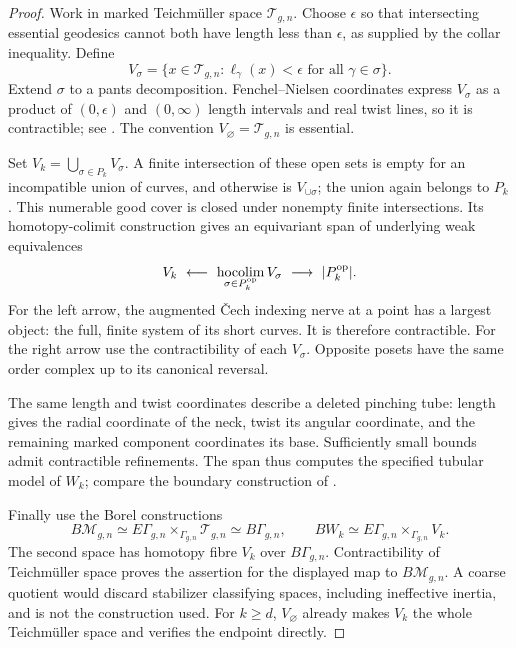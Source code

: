 \begin{proof}
Work in marked Teichm\"uller space \(\mathcal T_{g,n}\).
Choose \(\epsilon\) so that intersecting essential geodesics cannot
both have length less than \(\epsilon\), as supplied by the collar
inequality. Define
\[
 V_\sigma=\{x\in\mathcal T_{g,n}:
               \ell_\gamma(x)<\epsilon\text{ for all }\gamma\in\sigma\}.
\]
Extend \(\sigma\) to a pants decomposition. Fenchel--Nielsen
coordinates express \(V_\sigma\) as a product of \((0,\epsilon)\)
and \((0,\infty)\) length intervals and real twist lines, so it is
contractible; see \citet[Chapter 1, Theorem 1.1]{Harer1988}.
The convention \(V_\varnothing=\mathcal T_{g,n}\) is essential.

Set \(V_k=\bigcup_{\sigma\in P_k}V_\sigma\). A finite intersection
of these open sets is empty for an incompatible union of curves,
and otherwise is \(V_{\cup\sigma}\); the union again belongs to
\(P_k\). This numerable good cover is closed under nonempty finite
intersections. Its homotopy-colimit construction gives an
equivariant span of underlying weak equivalences
\[
 V_k\ \longleftarrow\
 \hocolim_{\sigma\in P_k^{\mathrm{op}}}V_\sigma
 \ \longrightarrow\ |P_k^{\mathrm{op}}|.
\]
For the left arrow, the augmented \v{C}ech indexing nerve at a
point has a largest object: the full, finite system of its short
curves. It is therefore contractible. For the right arrow use the
contractibility of each \(V_\sigma\). Opposite posets have the same
order complex up to its canonical reversal.

The same length and twist coordinates describe a deleted pinching
tube: length gives the radial coordinate of the neck, twist its
angular coordinate, and the remaining marked component coordinates
its base. Sufficiently small bounds admit contractible refinements.
The span thus computes the specified tubular model of \(W_k\);
compare the boundary construction of
\citet[Chapter 3, Lemma 3.6]{Harer1988}.

Finally use the Borel constructions
\[
 B\mathcal M_{g,n}\simeq
 E\Gamma_{g,n}\times_{\Gamma_{g,n}}\mathcal T_{g,n}
 \simeq B\Gamma_{g,n},\qquad
 BW_k\simeq E\Gamma_{g,n}\times_{\Gamma_{g,n}}V_k .
\]
The second space has homotopy fibre \(V_k\) over \(B\Gamma_{g,n}\).
Contractibility of Teichm\"uller space proves the assertion for
the displayed map to \(B\mathcal M_{g,n}\).
A coarse quotient would discard stabilizer classifying spaces,
including ineffective inertia, and is not the construction used.
For \(k\geq d\), \(V_\varnothing\) already makes \(V_k\) the whole
Teichm\"uller space and verifies the endpoint directly.
\end{proof}

